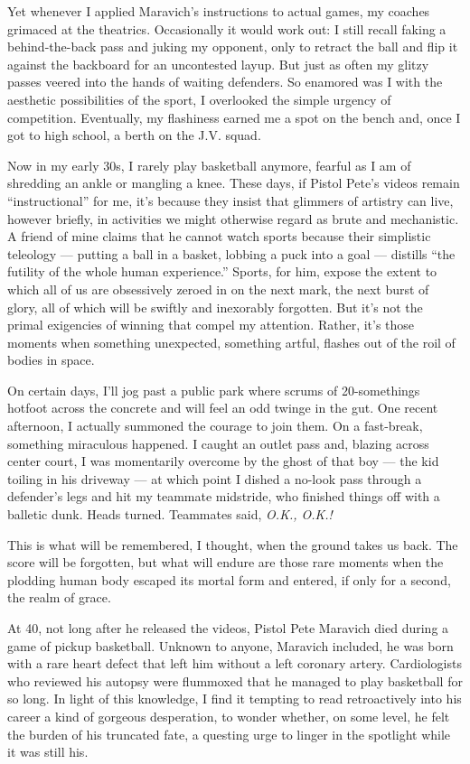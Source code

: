 Yet whenever I applied Maravich's instructions to actual games, my
coaches grimaced at the theatrics. Occasionally it would work out: I
still recall faking a behind-the-back pass and juking my opponent, only
to retract the ball and flip it against the backboard for an uncontested
layup. But just as often my glitzy passes veered into the hands of
waiting defenders. So enamored was I with the aesthetic possibilities of
the sport, I overlooked the simple urgency of competition. Eventually,
my flashiness earned me a spot on the bench and, once I got to high
school, a berth on the J.V. squad.

Now in my early 30s, I rarely play basketball anymore, fearful as I am
of shredding an ankle or mangling a knee. These days, if Pistol Pete's
videos remain ``instructional'' for me, it's because they insist that
glimmers of artistry can live, however briefly, in activities we might
otherwise regard as brute and mechanistic. A friend of mine claims that
he cannot watch sports because their simplistic teleology --- putting a
ball in a basket, lobbing a puck into a goal --- distills ``the futility
of the whole human experience.'' Sports, for him, expose the extent to
which all of us are obsessively zeroed in on the next mark, the next
burst of glory, all of which will be swiftly and inexorably forgotten.
But it's not the primal exigencies of winning that compel my attention.
Rather, it's those moments when something unexpected, something artful,
flashes out of the roil of bodies in space.

On certain days, I'll jog past a public park where scrums of
20-somethings hotfoot across the concrete and will feel an odd twinge in
the gut. One recent afternoon, I actually summoned the courage to join
them. On a fast-break, something miraculous happened. I caught an outlet
pass and, blazing across center court, I was momentarily overcome by the
ghost of that boy --- the kid toiling in his driveway --- at which point
I dished a no-look pass through a defender's legs and hit my teammate
midstride, who finished things off with a balletic dunk. Heads turned.
Teammates said, \emph{O.K., O.K.!}

This is what will be remembered, I thought, when the ground takes us
back. The score will be forgotten, but what will endure are those rare
moments when the plodding human body escaped its mortal form and
entered, if only for a second, the realm of grace.

At 40, not long after he released the videos, Pistol Pete Maravich died
during a game of pickup basketball. Unknown to anyone, Maravich
included, he was born with a rare heart defect that left him without a
left coronary artery. Cardiologists who reviewed his autopsy were
flummoxed that he managed to play basketball for so long. In light of
this knowledge, I find it tempting to read retroactively into his career
a kind of gorgeous desperation, to wonder whether, on some level, he
felt the burden of his truncated fate, a questing urge to linger in the
spotlight while it was still his.

